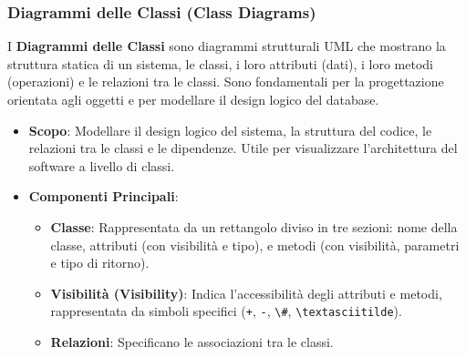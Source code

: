 \subsubsection{Diagrammi delle Classi (Class Diagrams)}
I \textbf{Diagrammi delle Classi} sono diagrammi strutturali UML che mostrano la struttura statica di un sistema, le classi, i loro attributi (dati), i loro metodi (operazioni) e le relazioni tra le classi. Sono fondamentali per la progettazione orientata agli oggetti e per modellare il design logico del database.

\begin{itemize}
    \item \textbf{Scopo}: Modellare il design logico del sistema, la struttura del codice, le relazioni tra le classi e le dipendenze. Utile per visualizzare l'architettura del software a livello di classi.
    \item \textbf{Componenti Principali}:
    \begin{itemize}
        \item \textbf{Classe}: Rappresentata da un rettangolo diviso in tre sezioni: nome della classe, attributi (con visibilità e tipo), e metodi (con visibilità, parametri e tipo di ritorno).
        \item \textbf{Visibilità (Visibility)}: Indica l'accessibilità degli attributi e metodi, rappresentata da simboli specifici (\lstinline{+}, \lstinline{-}, \lstinline{\#}, \lstinline{\textasciitilde}).
        \item \textbf{Relazioni}: Specificano le associazioni tra le classi.
    \end{itemize}
\end{itemize}

